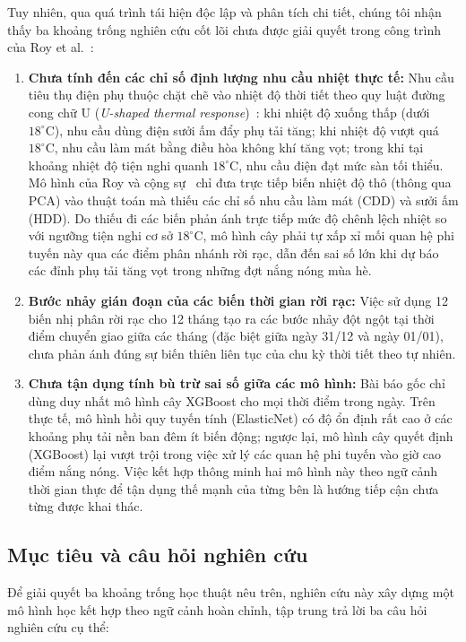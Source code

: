 Tuy nhiên, qua quá trình tái hiện độc lập và phân tích chi tiết, chúng tôi nhận thấy ba khoảng trống nghiên cứu cốt lõi chưa được giải quyết trong công trình của Roy et al.~\cite{roy2025hourly}:
\begin{enumerate}
    \item \textbf{Chưa tính đến các chỉ số định lượng nhu cầu nhiệt thực tế:} Nhu cầu tiêu thụ điện phụ thuộc chặt chẽ vào nhiệt độ thời tiết theo quy luật đường cong chữ U (\textit{U-shaped thermal response})~\cite{quayle1980heating, ashrae2021fundamentals}: khi nhiệt độ xuống thấp (dưới $18^\circ\text{C}$), nhu cầu dùng điện sưởi ấm đẩy phụ tải tăng; khi nhiệt độ vượt quá $18^\circ\text{C}$, nhu cầu làm mát bằng điều hòa không khí tăng vọt; trong khi tại khoảng nhiệt độ tiện nghi quanh $18^\circ\text{C}$, nhu cầu điện đạt mức sàn tối thiểu. Mô hình của Roy và cộng sự~\cite{roy2025hourly} chỉ đưa trực tiếp biến nhiệt độ thô (thông qua PCA) vào thuật toán mà thiếu các chỉ số nhu cầu làm mát (CDD) và sưởi ấm (HDD). Do thiếu đi các biến phản ánh trực tiếp mức độ chênh lệch nhiệt so với ngưỡng tiện nghi cơ sở $18^\circ\text{C}$, mô hình cây phải tự xấp xỉ mối quan hệ phi tuyến này qua các điểm phân nhánh rời rạc, dẫn đến sai số lớn khi dự báo các đỉnh phụ tải tăng vọt trong những đợt nắng nóng mùa hè.
    \item \textbf{Bước nhảy gián đoạn của các biến thời gian rời rạc:} Việc sử dụng 12 biến nhị phân rời rạc cho 12 tháng tạo ra các bước nhảy đột ngột tại thời điểm chuyển giao giữa các tháng (đặc biệt giữa ngày 31/12 và ngày 01/01), chưa phản ánh đúng sự biến thiên liên tục của chu kỳ thời tiết theo tự nhiên.
    \item \textbf{Chưa tận dụng tính bù trừ sai số giữa các mô hình:} Bài báo gốc chỉ dùng duy nhất mô hình cây XGBoost cho mọi thời điểm trong ngày. Trên thực tế, mô hình hồi quy tuyến tính (ElasticNet) có độ ổn định rất cao ở các khoảng phụ tải nền ban đêm ít biến động; ngược lại, mô hình cây quyết định (XGBoost) lại vượt trội trong việc xử lý các quan hệ phi tuyến vào giờ cao điểm nắng nóng. Việc kết hợp thông minh hai mô hình này theo ngữ cảnh thời gian thực để tận dụng thế mạnh của từng bên là hướng tiếp cận chưa từng được khai thác.
\end{enumerate}

\subsection{Mục tiêu và câu hỏi nghiên cứu}
Để giải quyết ba khoảng trống học thuật nêu trên, nghiên cứu này xây dựng một mô hình học kết hợp theo ngữ cảnh hoàn chỉnh, tập trung trả lời ba câu hỏi nghiên cứu cụ thể:

